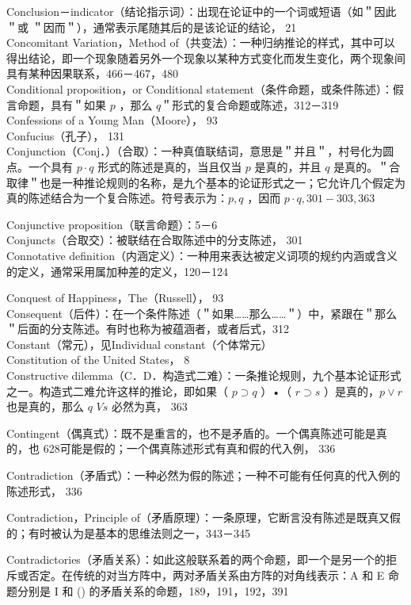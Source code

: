 Conclusion－indicator（结论指示词）：出现在论证中的一个词或短语（如＂因此＂或 ＂因而＂），通常表示尾随其后的是该论证的结论， 21\\
Concomitant Variation，Method of（共变法）：一种归纳推论的样式，其中可以得出结论，即一个现象随着另外一个现象以某种方式变化而发生变化，两个现象间具有某种因果联系，466－467，480\\
Conditional proposition，or Conditional statement（条件命题，或条件陈述）：假言命题，具有＂如果 $p$ ，那么 $q$＂形式的复合命题或陈述，312－319\\
Confessions of a Young Man（Moore）， 93\\
Confucius（孔子）， 131\\
Conjunction（Conj．）（合取）：一种真值联结词，意思是＂并且＂，村号化为圆点。一个具有 $p \cdot q$ 形式的陈述是真的，当且仅当 $p$ 是真的，并且 $q$ 是真的。＂合取律＂也是一种推论规则的名称，是九个基本的论证形式之一；它允许几个假定为真的陈述结合为一个复合陈述。符号表示为：$p, q$ ，因而 $p \cdot q, 301-303,363$

Conjunctive proposition（联言命题）：5－6\\
Conjuncts（合取交）：被联结在合取陈述中的分支陈述， 301\\
Connotative definition（内涵定义）：一种用来表达被定义词项的规约内涵或含义的定义，通常采用属加种差的定义，120－124

Conquest of Happiness，The（Russell）， 93\\
Consequent（后件）：在一个条件陈述（＂如果……那么……＂）中，紧跟在＂那么＂后面的分支陈述。有时也称为被蕴涵者，或者后式，312\\
Constant（常元），见Individual constant（个体常元）\\
Constitution of the United States， 8\\
Constructive dilemma（C．D．构造式二难）：一条推论规则，九个基本论证形式之一。构造式二难允许这样的推论，即如果（ $p \supset q$ ）•（ $r \supset s$ ）是真的，$p \vee r$ 也是真的，那么 $q$ $V s$ 必然为真， 363

Contingent（偶真式）：既不是重言的，也不是矛盾的。一个偶真陈述可能是真的，也 628可能是假的；一个偶真陈述形式有真和假的代入例， 336

Contradiction（矛盾式）：一种必然为假的陈述；一种不可能有任何真的代入例的陈述形式， 336

Contradiction，Principle of（矛盾原理）：一条原理，它断言没有陈述是既真又假的；有时被认为是基本的思维法则之一，343－345

Contradictories（矛盾关系）：如此这般联系着的两个命题，即一个是另一个的拒斥或否定。在传统的对当方阵中，两对矛盾关系由方阵的对角线表示：A 和 E 命题分别是 I 和 () 的矛盾关系的命题，189，191，192，391

